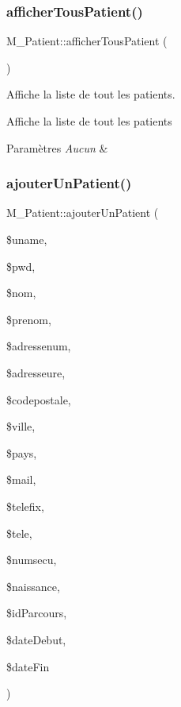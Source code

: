 \subsubsection{\texorpdfstring{afficher\+Tous\+Patient()}{afficherTousPatient()}}
{\footnotesize\ttfamily M\+\_\+\+Patient\+::afficher\+Tous\+Patient (\begin{DoxyParamCaption}{ }\end{DoxyParamCaption})}



Affiche la liste de tout les patients. 

Affiche la liste de tout les patients 
\begin{DoxyParams}{Paramètres}
{\em Aucun} & \\
\hline
\end{DoxyParams}
\mbox{\label{class_m___patient_aa84f7a3be1a139c0392af7f48ba5de9f}} 
\subsubsection{\texorpdfstring{ajouter\+Un\+Patient()}{ajouterUnPatient()}}
{\footnotesize\ttfamily M\+\_\+\+Patient\+::ajouter\+Un\+Patient (\begin{DoxyParamCaption}\item[{}]{\$uname,  }\item[{}]{\$pwd,  }\item[{}]{\$nom,  }\item[{}]{\$prenom,  }\item[{}]{\$adressenum,  }\item[{}]{\$adresseure,  }\item[{}]{\$codepostale,  }\item[{}]{\$ville,  }\item[{}]{\$pays,  }\item[{}]{\$mail,  }\item[{}]{\$telefix,  }\item[{}]{\$tele,  }\item[{}]{\$numsecu,  }\item[{}]{\$naissance,  }\item[{}]{\$id\+Parcours,  }\item[{}]{\$date\+Debut,  }\item[{}]{\$date\+Fin }\end{DoxyParamCaption})}



